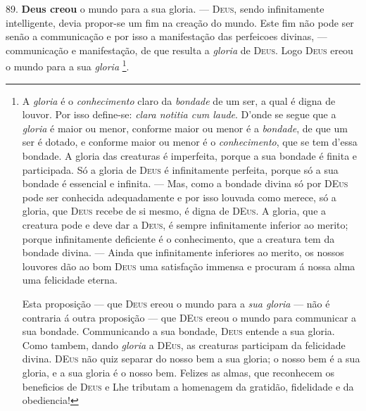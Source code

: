  89. \textbf{Deus creou} o mundo para a sua gloria. --- \textsc{Deus}, sendo infinitamente intelligente, devia propor-se um fim na creação do mundo. Este fim não pode ser senão a communicação e por isso a manifestação das perfeicoes divinas, --- communicação e manifestação, de que resulta a \emph{gloria} de \textsc{Deus}. Logo \textsc{Deus} ereou o mundo para a sua \emph{gloria} \footnote{A \emph{gloria} é o \emph{conhecimento} claro da \emph{bondade} de um ser, a qual é digna de louvor. Por isso define-se: \emph{clara notitia cum laude}. D'onde se segue que a \emph{gloria} é maior ou menor, conforme maior ou menor é a \emph{bondade}, de que um ser é dotado, e conforme maior ou menor é o \emph{conhecimento}, que se tem d'essa bondade. A gloria das creaturas é imperfeita, porque a sua bondade é finita e participada. Só a gloria de \textsc{Deus} é infinitamente perfeita, porque só a sua bondade é essencial e infinita. --- Mas, como a bondade divina só por \textsc{DEus} pode ser conhecida adequadamente e por isso louvada como merece, só a gloria, que \textsc{Deus} recebe de si mesmo, é digna de \textsc{DEus}. A gloria, que a creatura pode e deve dar a \textsc{Deus}, é sempre infinitamente inferior ao merito; porque infinitamente deficiente é o conhecimento, que a creatura tem da bondade divina. --- Ainda que infinitamente inferiores ao merito, os nossos louvores dão ao bom \textsc{Deus} uma satisfação immensa e procuram á nossa alma uma felicidade eterna.\par Esta proposição --- que \textsc{Deus} ereou o mundo para a \emph{sua gloria} --- não é contraria á outra proposição --- que \textsc{DEus} ereou o mundo para communicar a sua bondade. Communicando a sua bondade, \textsc{Deus} entende a sua gloria. Como tambem, dando \emph{gloria} a \textsc{DEus}, as creaturas participam da felicidade divina. \textsc{DEus} não quiz separar do nosso bem a sua gloria; o nosso bem é a sua gloria, e a sua gloria é o nosso bem. Felizes as almas, que reconhecem os beneficios de \textsc{Deus} e Lhe tributam a homenagem da gratidão, fidelidade e da obediencia!}.
